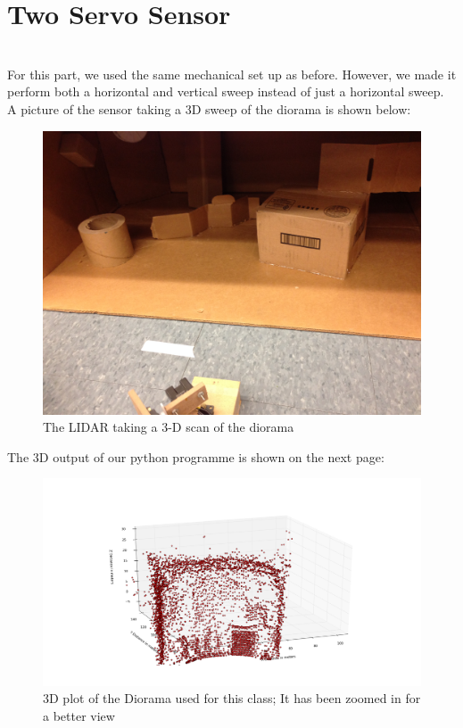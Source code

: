\documentclass{article}
\begin{document}
\section{Two Servo Sensor} \ \\
%
For this part, we used the same mechanical set up as before. However, we made it perform both a horizontal and vertical sweep instead of just a horizontal sweep. A picture of the sensor taking a 3D sweep of the diorama is shown below:

\begin{figure}[h!]
\begin{center}
\includegraphics[scale=0.06]{3dscan.JPG}
\caption{The LIDAR taking a 3-D scan of the diorama}
\end{center}
\end{figure}
%
The 3D output of our python programme is shown on the next page:
%
\begin{figure}[h!]
\begin{center}
\includegraphics[scale=0.4]{3D_diarama2.png}
\caption{3D plot of the Diorama used for this class; It has been zoomed in for a better view}
\end{center}
\end{figure}
\end{document}
